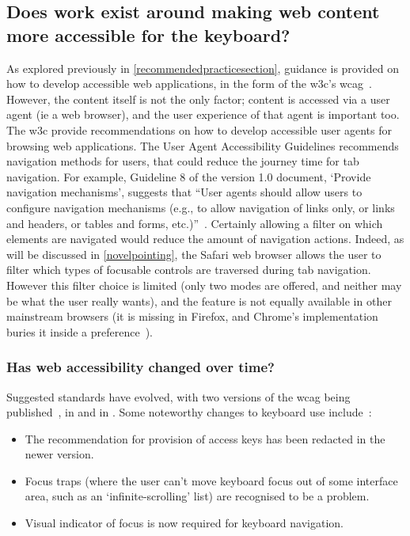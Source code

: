 \documentclass[a4paper, 11pt]{article}
\begin{document}
\subsection{Does work exist around making web content more accessible for the keyboard?}
\label{makingwebcontentkeyboardaccessible}
As explored previously in \cref{recommendedpracticesection}, guidance is provided on how to develop accessible web applications, in the form of the \gls{w3c}'s \gls{wcag}~\cite{chisholm2001web,wcag}. However, the content itself is not the only factor; content is accessed via a user agent (ie a web browser), and the user experience of that agent is important too. The \gls{w3c} provide recommendations on how to develop accessible user agents for browsing web applications\cite{jacobs2000user,allan2010user}. The User Agent Accessibility Guidelines recommends navigation methods for users, that could reduce the journey time for tab navigation. For example, Guideline 8 of the version 1.0 document, `Provide navigation mechanisms', suggests that ``User agents should allow users to configure navigation mechanisms (e.g., to allow navigation of links only, or links and headers, or tables and forms, etc.)''~\parencite[][p.17]{jacobs2000user}. Certainly allowing a filter on which elements are navigated would reduce the amount of navigation actions. Indeed, as will be discussed in \cref{novelpointing}, the Safari web browser allows the user to filter which types of focusable controls are traversed during tab navigation. However this filter choice is limited (only two modes are offered, and neither may be what the user really wants), and the feature is not equally available in other mainstream browsers (it is missing in Firefox, and Chrome's implementation buries it inside a preference~\cite{browserkeyboardaccess}).
\subsubsection{Has web accessibility changed over time?}
Suggested standards have evolved, with two versions of the \gls{wcag} being published~\cite{chisholm2001web,wcag}, in \citeyear{chisholm2001web} and in \citeyear{wcag}. Some noteworthy changes to keyboard use include~\cite{wcagcomparison}:
\begin{itemize}
\item The recommendation for provision of access keys has been redacted in the newer version.
\item Focus traps (where the user can't move keyboard focus out of some interface area, such as an `infinite-scrolling' list) are recognised to be a problem.
\item Visual indicator of focus is now required for keyboard navigation.
\end{itemize}
\end{document}
